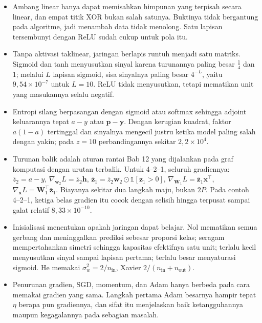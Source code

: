 \begin{ringkasan}
\begin{itemize}
  \item Ambang linear hanya dapat memisahkan himpunan yang terpisah secara linear, dan empat
        titik XOR bukan salah satunya. Buktinya tidak bergantung pada algoritme, jadi
        menambah data tidak menolong. Satu lapisan tersembunyi dengan ReLU sudah cukup untuk
        pola itu.
  \item Tanpa aktivasi taklinear, jaringan berlapis runtuh menjadi satu matriks. Sigmoid dan
        tanh menyusutkan sinyal karena turunannya paling besar $\tfrac14$ dan $1$; melalui
        $L$ lapisan sigmoid, sisa sinyalnya paling besar $4^{-L}$, yaitu
        $9{,}54\times10^{-7}$ untuk $L=10$. ReLU tidak menyusutkan, tetapi mematikan unit
        yang masukannya selalu negatif.
  \item Entropi silang berpasangan dengan sigmoid atau softmax sehingga adjoint keluarannya
        tepat $a-y$ atau $\mathbf{p}-\mathbf{y}$. Dengan kerugian kuadrat, faktor $a(1-a)$
        tertinggal dan sinyalnya mengecil justru ketika model paling salah dengan yakin;
        pada $z=10$ perbandingannya sekitar $2{,}2\times10^{4}$.
  \item Turunan balik adalah aturan rantai Bab 12 yang dijalankan pada graf komputasi dengan
        urutan terbalik. Untuk 4--2--1, seluruh gradiennya:
        $\bar{z}_{2}=a-y$, $\nabla_{\mathbf{w}_{2}}L=\bar{z}_{2}\mathbf{h}$,
        $\bar{\mathbf{z}}_{1}=\bar{z}_{2}\mathbf{w}_{2}\odot\mathbb{1}[\mathbf{z}_{1}>0]$,
        $\nabla_{\mathbf{W}_{1}}L=\bar{\mathbf{z}}_{1}\mathbf{x}^{\top}$,
        $\nabla_{\mathbf{x}}L=\mathbf{W}_{1}^{\top}\bar{\mathbf{z}}_{1}$. Biayanya sekitar dua langkah maju, bukan $2P$. Pada contoh 4--2--1, ketiga belas gradien itu cocok dengan selisih hingga terpusat sampai galat relatif $8{,}33\times10^{-10}$.
  \item Inisialisasi menentukan apakah jaringan dapat belajar. Nol mematikan semua gerbang
        dan meninggalkan prediksi sebesar proporsi kelas; seragam mempertahankan simetri
        sehingga kapasitas efektifnya satu unit; terlalu kecil menyusutkan sinyal sampai
        lapisan pertama; terlalu besar menyaturasi sigmoid. He memakai
        $\sigma_{w}^{2}=2/n_{\mathrm{in}}$, Xavier $2/(n_{\mathrm{in}}+n_{\mathrm{out}})$.
  \item Penurunan gradien, SGD, momentum, dan Adam hanya berbeda pada cara memakai gradien
        yang sama. Langkah pertama Adam besarnya hampir tepat $\eta$ berapa pun gradiennya,
        dan sifat itu menjelaskan baik ketangguhannya maupun kegagalannya pada sebagian
        masalah.
  
\end{itemize}
\end{ringkasan}

